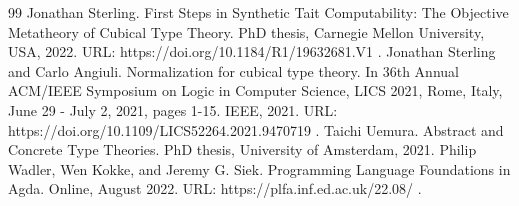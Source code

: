 \documentclass[10pt,a4paper]{amsart}
\begin{document}
\begin{thebibliography}{99}
 Jonathan Sterling. First Steps in Synthetic Tait Computability: The Objective Metatheory of Cubical Type Theory. PhD thesis, Carnegie Mellon University, USA, 2022. URL: https://doi.org/10.1184/R1/19632681.V1 .
 Jonathan Sterling and Carlo Angiuli. Normalization for cubical type theory. In 36th Annual ACM/IEEE Symposium on Logic in Computer Science, LICS 2021, Rome, Italy, June 29 - July 2, 2021, pages 1-15. IEEE, 2021. URL: https://doi.org/10.1109/LICS52264.2021.9470719 .
 Taichi Uemura. Abstract and Concrete Type Theories. PhD thesis, University of Amsterdam, 2021.
 Philip Wadler, Wen Kokke, and Jeremy G. Siek. Programming Language Foundations in Agda. Online, August 2022. URL: https://plfa.inf.ed.ac.uk/22.08/ .
\end{thebibliography}
\end{document}
